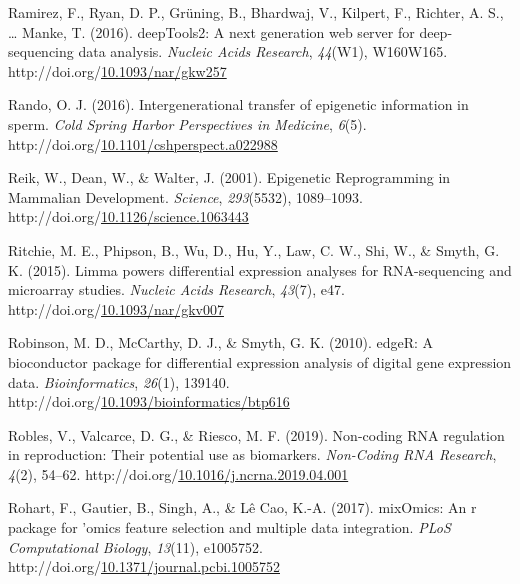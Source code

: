 \documentclass[12pt,twoside]{reedthesis}
\newlength{\cslhangindent}
\newenvironment{CSLReferences}[2] %
 {%
  \setlength{\parindent}{0pt}
  \ifodd #1 \everypar{\setlength{\hangindent}{\cslhangindent}}\ignorespaces\fi
  \ifnum #2 > 0
  \setlength{\parskip}{#2\baselineskip}
  \fi
 }%
 {}
\begin{document}
\begin{CSLReferences}{1}{0}
\leavevmode{}%
Ramirez, F., Ryan, D. P., Grüning, B., Bhardwaj, V., Kilpert, F., Richter, A. S., \ldots{} Manke, T. (2016). deepTools2: A next generation web server for deep-sequencing data analysis. \emph{Nucleic Acids Research}, \emph{44}(W1), W160W165. http://doi.org/\href{https://doi.org/10.1093/nar/gkw257}{10.1093/nar/gkw257}

\leavevmode{}%
Rando, O. J. (2016). Intergenerational transfer of epigenetic information in sperm. \emph{Cold Spring Harbor Perspectives in Medicine}, \emph{6}(5). http://doi.org/\href{https://doi.org/10.1101/cshperspect.a022988}{10.1101/cshperspect.a022988}

\leavevmode{}%
Reik, W., Dean, W., \& Walter, J. (2001). Epigenetic Reprogramming in Mammalian Development. \emph{Science}, \emph{293}(5532), 1089--1093. http://doi.org/\href{https://doi.org/10.1126/science.1063443}{10.1126/science.1063443}

\leavevmode{}%
Ritchie, M. E., Phipson, B., Wu, D., Hu, Y., Law, C. W., Shi, W., \& Smyth, G. K. (2015). Limma powers differential expression analyses for RNA-sequencing and microarray studies. \emph{Nucleic Acids Research}, \emph{43}(7), e47. http://doi.org/\href{https://doi.org/10.1093/nar/gkv007}{10.1093/nar/gkv007}

\leavevmode{}%
Robinson, M. D., McCarthy, D. J., \& Smyth, G. K. (2010). edgeR: A bioconductor package for differential expression analysis of digital gene expression data. \emph{Bioinformatics}, \emph{26}(1), 139140. http://doi.org/\href{https://doi.org/10.1093/bioinformatics/btp616}{10.1093/bioinformatics/btp616}

\leavevmode{}%
Robles, V., Valcarce, D. G., \& Riesco, M. F. (2019). Non-coding RNA regulation in reproduction: Their potential use as biomarkers. \emph{Non-Coding RNA Research}, \emph{4}(2), 54--62. http://doi.org/\href{https://doi.org/10.1016/j.ncrna.2019.04.001}{10.1016/j.ncrna.2019.04.001}

\leavevmode{}%
Rohart, F., Gautier, B., Singh, A., \& Lê Cao, K.-A. (2017). mixOmics: An r package for 'omics feature selection and multiple data integration. \emph{PLoS Computational Biology}, \emph{13}(11), e1005752. http://doi.org/\href{https://doi.org/10.1371/journal.pcbi.1005752}{10.1371/journal.pcbi.1005752}


\end{CSLReferences}
\end{document}

